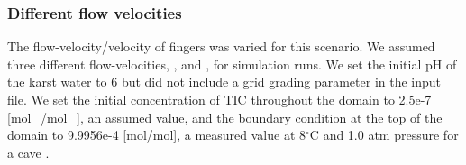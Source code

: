 \subsubsection*{Different flow velocities}\label{ssec:diffFlowVel}
The flow-velocity/velocity of  fingers was varied for this scenario. We assumed three different flow-velocities, , 
 and , 
for simulation runs. We set the initial pH of the karst water to 6 but did not include a grid grading parameter in the input file. 
We set the initial concentration of TIC throughout the domain to 2.5e-7 [mol\_/mol\_], an assumed value, and the 
boundary condition at the top of the domain to 9.9956e-4 [mol/mol], a measured value at 8$^{\circ}$C and 1.0 atm pressure for a cave \cite{Class2020}. \\

